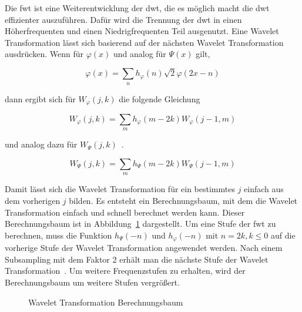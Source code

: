 \documentclass[12pt, a4paper, ngerman]{article}
\begin{document}
Die \acf{fwt} ist eine Weiterentwicklung der \ac{dwt},
die es möglich macht die \ac{dwt} effizienter auszuführen.
Dafür wird die Trennung der \ac{dwt} in einen Höherfrequenten
und einen Niedrigfrequenten Teil ausgenutzt.
Eine Wavelet Transformation lässt sich basierend
auf der nächsten Wavelet Transformation ausdrücken.
Wenn für \(\varphi(x)\) und analog für \(\Psi(x)\) gilt,

\[
  \varphi(x) = \sum_n h_{\varphi}(n)\sqrt{2}\varphi(2x-n)
\]

dann ergibt sich für \(W_\varphi(j,k)\) die folgende Gleichung~\cite[S.11]{wavelet_analysis}

\[
  W_\varphi(j,k)=\sum_m h_\varphi(m-2k)W_\varphi(j-1,m)
\]

und analog dazu für \(W_\Psi(j,k)\)~\cite[S.11]{wavelet_analysis}.

\[
  W_\Psi(j,k)=\sum_m h_\Psi(m-2k)W_\Psi(j-1,m)
\]

Damit lässt sich die Wavelet Transformation für ein bestimmtes \(j\)
einfach aus dem vorherigen \(j\) bilden.
Es entsteht ein Berechnungsbaum, mit dem die Wavelet Transformation
einfach und schnell berechnet werden kann.
Dieser Berechnungsbaum ist in Abbildung~\ref{fig:wavelet_tree} dargestellt.
Um eine Stufe der \ac{fwt} zu berechnen,
muss die Funktion \(h_\Psi(-n)\) und \(h_\varphi(-n)\) mit \(n=2k,k\leq 0\)
auf die vorherige Stufe der Wavelet Transformation angewendet werden.
Nach einem Subsampling mit dem Faktor 2 erhält man
die nächste Stufe der Wavelet Transformation~\cite[S.12]{wavelet_analysis}.
Um weitere Frequenzstufen zu erhalten,
wird der Berechnungsbaum um weitere Stufen vergrößert.

\begin{figure}
  \centering
  \caption{Wavelet Transformation Berechnungsbaum}
  \label{fig:wavelet_tree}
\end{figure}
\end{document}
